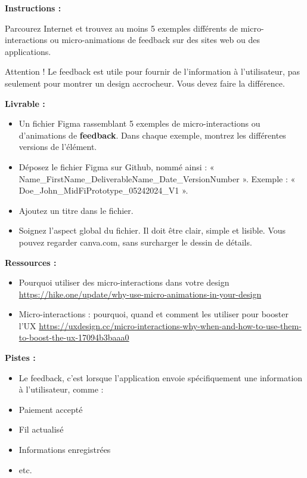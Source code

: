 \makeheaderfiles

\textbf{Instructions :}

Parcourez Internet et trouvez au moins 5 exemples différents de micro-interactions ou micro-animations de feedback sur des sites web ou des applications.

Attention ! Le feedback est utile pour fournir de l'information à l'utilisateur, pas seulement pour montrer un design accrocheur. Vous devez faire la différence.

\textbf{Livrable :}

\begin{itemize}
\item Un fichier Figma rassemblant 5 exemples de micro-interactions ou d'animations de \textbf{feedback}. Dans chaque exemple, montrez les différentes versions de l'élément.
\item Déposez le fichier Figma sur Github, nommé ainsi : « Name\_FirstName\_DeliverableName\_Date\_VersionNumber ». Exemple : « Doe\_John\_MidFiPrototype\_05242024\_V1 ».
\item Ajoutez un titre dans le fichier.
\item Soignez l'aspect global du fichier. Il doit être clair, simple et lisible. Vous pouvez regarder canva.com, sans surcharger le dessin de détails.
\end{itemize}

\textbf{Ressources :}

\begin{itemize}
\item Pourquoi utiliser des micro-interactions dans votre design \url{https://hike.one/update/why-use-micro-animations-in-your-design}
\item Micro-interactions : pourquoi, quand et comment les utiliser pour booster l'UX \url{https://uxdesign.cc/micro-interactions-why-when-and-how-to-use-them-to-boost-the-ux-17094b3baaa0}
\end{itemize}

\textbf{Pistes :}

\begin{itemize}
\item Le feedback, c'est lorsque l'application envoie spécifiquement une information à l'utilisateur, comme :
\item Paiement accepté
\item Fil actualisé
\item Informations enregistrées
\item etc.
\end{itemize}

